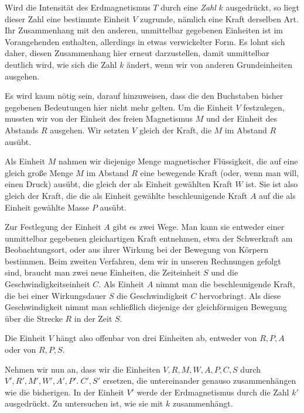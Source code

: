 Wird die Intensität des Erdmagnetismus $T$ durch eine \textit{Zahl} $k$ ausgedrückt, so liegt dieser Zahl eine bestimmte Einheit $V$ zugrunde, nämlich eine Kraft derselben Art. Ihr Zusammenhang mit den anderen, unmittelbar gegebenen Einheiten ist im Vorangehenden enthalten, allerdings in etwas verwickelter Form. Es lohnt sich daher, diesen Zusammenhang hier erneut darzustellen, damit unmittelbar deutlich wird, wie sich die Zahl $k$ ändert, wenn wir von anderen Grundeinheiten ausgehen.

\expandafter\def\csname HistoricalNoteText13\endcsname{Es wird kaum nötig sein, darauf hinzuweisen, dass die den Buchstaben bisher gegebenen Bedeutungen hier nicht mehr gelten.}
Um die Einheit $V$ festzulegen, mussten wir von der Einheit des freien Magnetismus $M$ und der Einheit des Abstands $R$ ausgehen. Wir setzten $V$ gleich der Kraft, die $M$ im Abstand $R$ ausübt.

Als Einheit $M$ nahmen wir diejenige Menge magnetischer Flüssigkeit, die auf eine gleich große Menge $M$ im Abstand $R$ eine bewegende Kraft (oder, wenn man will, einen Druck) ausübt, die gleich der als Einheit gewählten Kraft $W$ ist. Sie ist also gleich der Kraft, die die als Einheit gewählte beschleunigende Kraft $A$ auf die als Einheit gewählte Masse $P$ ausübt.

Zur Festlegung der Einheit $A$ gibt es zwei Wege. Man kann sie entweder einer unmittelbar gegebenen gleichartigen Kraft entnehmen, etwa der Schwerkraft am Beobachtungsort, oder aus ihrer Wirkung bei der Bewegung von Körpern bestimmen. Beim zweiten Verfahren, dem wir in unseren Rechnungen gefolgt sind, braucht man zwei neue Einheiten, die Zeiteinheit $S$ und die Geschwindigkeitseinheit $C$. Als Einheit $A$ nimmt man die beschleunigende Kraft, die bei einer Wirkungsdauer $S$ die Geschwindigkeit $C$ hervorbringt. Als diese Geschwindigkeit nimmt man schließlich diejenige der gleichförmigen Bewegung über die Strecke $R$ in der Zeit $S$.

Die Einheit $V$ hängt also offenbar von drei Einheiten ab, entweder von $R,P,A$ oder von $R,P,S$.

Nehmen wir nun an, dass wir die Einheiten $V,R,M,W,A,P,C,S$ durch $V',\allowbreak R',\allowbreak M',\allowbreak W',\allowbreak A',\allowbreak P'.\allowbreak\ C',\allowbreak S'$ ersetzen, die untereinander genauso zusammenhängen wie die bisherigen. In der Einheit $V'$ werde der Erdmagnetismus durch die Zahl $k'$ ausgedrückt. Zu untersuchen ist, wie sie mit $k$ zusammenhängt.

